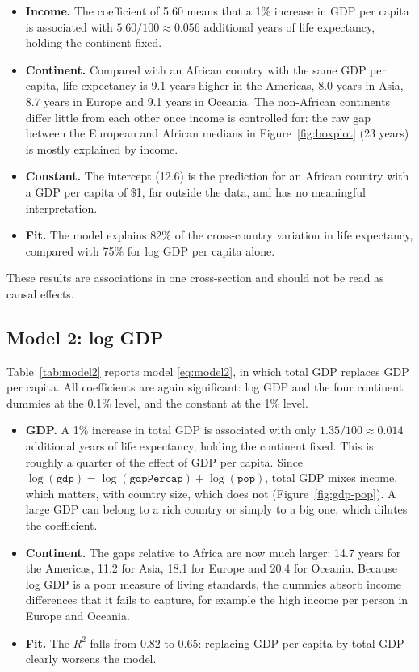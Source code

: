 \documentclass[a4paper,12pt]{article}
\begin{document}
\begin{itemize}
    \item \textbf{Income.} The coefficient of 5.60 means that a 1\% increase in GDP per capita is associated with $5.60/100 \approx 0.056$ additional years of life expectancy, holding the continent fixed.
    \item \textbf{Continent.} Compared with an African country with the same GDP per capita, life expectancy is 9.1 years higher in the Americas, 8.0 years in Asia, 8.7 years in Europe and 9.1 years in Oceania. The non-African continents differ little from each other once income is controlled for: the raw gap between the European and African medians in Figure~\ref{fig:boxplot} (23 years) is mostly explained by income.
    \item \textbf{Constant.} The intercept (12.6) is the prediction for an African country with a GDP per capita of \$1, far outside the data, and has no meaningful interpretation.
    \item \textbf{Fit.} The model explains 82\% of the cross-country variation in life expectancy, compared with 75\% for log GDP per capita alone.
\end{itemize}

These results are associations in one cross-section and should not be read as causal effects.

\FloatBarrier
\subsection{Model 2: log GDP}

Table~\ref{tab:model2} reports model \eqref{eq:model2}, in which total GDP replaces GDP per capita. All coefficients are again significant: log GDP and the four continent dummies at the 0.1\% level, and the constant at the 1\% level.



\begin{itemize}
    \item \textbf{GDP.} A 1\% increase in total GDP is associated with only $1.35/100 \approx 0.014$ additional years of life expectancy, holding the continent fixed. This is roughly a quarter of the effect of GDP per capita. Since $\log(\texttt{gdp}) = \log(\texttt{gdpPercap}) + \log(\texttt{pop})$, total GDP mixes income, which matters, with country size, which does not (Figure~\ref{fig:gdp-pop}). A large GDP can belong to a rich country or simply to a big one, which dilutes the coefficient.
    \item \textbf{Continent.} The gaps relative to Africa are now much larger: 14.7 years for the Americas, 11.2 for Asia, 18.1 for Europe and 20.4 for Oceania. Because log GDP is a poor measure of living standards, the dummies absorb income differences that it fails to capture, for example the high income per person in Europe and Oceania.
    \item \textbf{Fit.} The $R^2$ falls from 0.82 to 0.65: replacing GDP per capita by total GDP clearly worsens the model.
\end{itemize}
\end{document}
